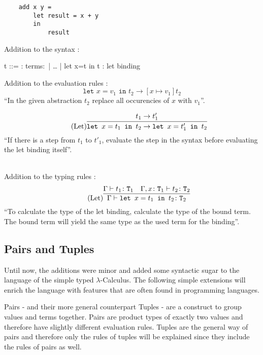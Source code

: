 \begin{verbatim}
    add x y =
        let result = x + y
        in
            result
\end{verbatim}

Addition to the syntax \cite{pierce2002ProgLang}:
\begin{bnfgrammar}
    t ::= : terms$\colon$
    | \dots
    | let x=t in t : let binding
\end{bnfgrammar}\leavevmode\newline

Addition to the evaluation rules \cite{pierce2002ProgLang}:
\begin{equation*}
    \tag{Let-Bind Value}
    \texttt{let } x=v_1 \texttt{ in } t_2 \rightarrow [x \mapsto v_1] t_2
\end{equation*}
``In the given abstraction $t_2$ replace all occurencies of $x$ with $v_1$''.

\begin{equation*}
    \tag{Let}
    \infer{
        \texttt{let } x=t_1 \texttt{ in } t_2 \rightarrow \texttt{let } x=t'_1 \texttt{ in } t_2
    }{
        t_1 \rightarrow t'_1
    }
\end{equation*}
``If there is a step from $t_1$ to $t'_1$, evaluate the step
in the syntax before evaluating the let binding itself''.

~\\
Addition to the typing rules \cite{pierce2002ProgLang}:
\begin{equation*}
    \tag{Let}
    \infer{
        \Gamma \vdash \texttt{let } x=t_1 \texttt{ in } t_2 \colon \texttt{T}_2
    }{
        \Gamma \vdash t_1 \colon \texttt{T}_1 & \Gamma , x \colon \texttt{T}_1 \vdash t_2 \colon \texttt{T}_2
    }
\end{equation*}
``To calculate the type of the let binding, calculate the type of the bound term. The bound
term will yield the same type as the used term for the binding''.

\subsection{Pairs and Tuples}

Until now, the additions were minor and added some syntactic sugar to the language of
the simple typed $\lambda$-Calculus. The following simple extensions will enrich
the language with features that are often found in programming languages.

Pairs - and their more general counterpart Tuples - are a construct to group
values and terms together. Pairs are product types of exactly two values
and therefore have slightly different evaluation rules. Tuples are the general way
of pairs and therefore only the rules of tuples will be explained since they include
the rules of pairs as well.

